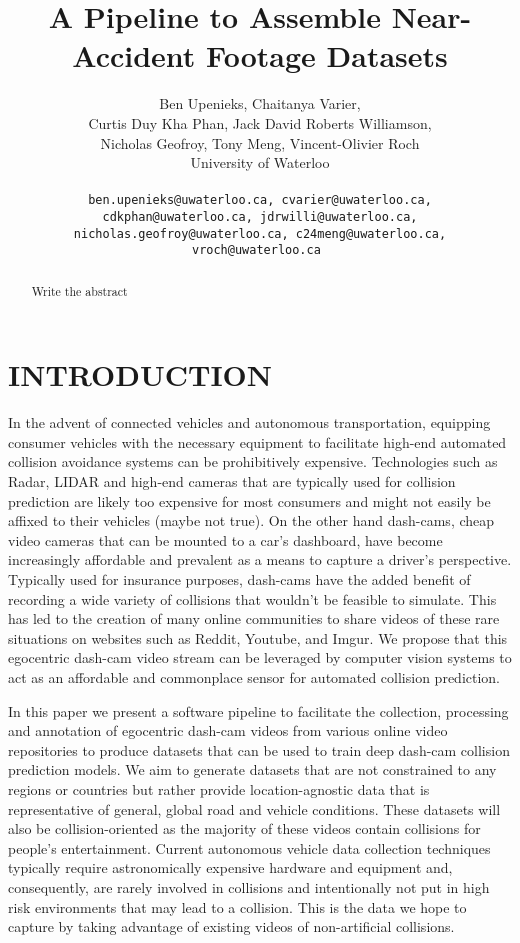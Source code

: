 \documentclass[letterpaper, 10 pt, conference]{IEEEconf}
\title{\LARGE \bf
A Pipeline to Assemble Near-Accident Footage Datasets
}
\author{
         Ben Upenieks, Chaitanya Varier,\\
         Curtis Duy Kha Phan, Jack David Roberts Williamson,\\
         Nicholas Geofroy, Tony Meng, Vincent-Olivier Roch\\
         University of Waterloo\\
         \\
         \tt\small ben.upenieks@uwaterloo.ca, cvarier@uwaterloo.ca,
         \\ \tt\small cdkphan@uwaterloo.ca, jdrwilli@uwaterloo.ca,
         \\ \tt\small nicholas.geofroy@uwaterloo.ca, c24meng@uwaterloo.ca, vroch@uwaterloo.ca
}
\newcommand{\todo}[1]{{\color{red}#1}}
\begin{document}
\maketitle
\thispagestyle{empty}
\pagestyle{empty}


\begin{abstract}

\todo{Write the abstract}

\end{abstract}

\section{INTRODUCTION}

In the advent of connected vehicles and autonomous transportation, equipping consumer vehicles with the necessary equipment to facilitate high-end automated collision avoidance systems can be prohibitively expensive.
Technologies such as Radar, LIDAR and high-end cameras that are typically used for collision prediction are likely too expensive for most consumers and might not easily be affixed to their vehicles (maybe not true).
On the other hand dash-cams, cheap video cameras that can be mounted to a car's dashboard, have become increasingly affordable and prevalent as a means to capture a driver’s perspective.
Typically used for insurance purposes, dash-cams have the added benefit of recording a wide variety of collisions that wouldn't be feasible to simulate. 
This has led to the creation of many online communities to share videos of these rare situations on websites such as Reddit, Youtube, and Imgur.
We propose that this egocentric dash-cam video stream can be leveraged by computer vision systems to act as an affordable and commonplace sensor for automated collision prediction. 

In this paper we present a software pipeline to facilitate the collection, processing and annotation of egocentric dash-cam videos from various online video repositories to produce datasets that can be used to train deep dash-cam collision prediction models.
We aim to generate datasets that are not constrained to any regions or countries but rather provide location-agnostic data that is representative of general, global road and vehicle conditions.
These datasets will also be collision-oriented as the majority of these videos contain collisions for people's entertainment.
Current autonomous vehicle data collection techniques typically require astronomically expensive hardware and equipment and, consequently, are rarely involved in collisions and intentionally not put in high risk environments that may lead to a collision.
This is the data we hope to capture by taking advantage of existing videos of non-artificial collisions.
\end{document}
